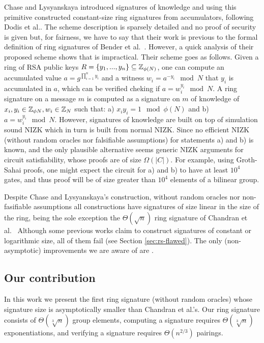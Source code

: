 Chase and Lysyanskaya introduced signatures of knowledge \cite{C:ChaLys06} and using this primitive constructed constant-size ring signatures from accumulators, following Dodis et al.\cite{EC:DKNS04}. The scheme description is sparsely detailed and no proof of security is given but, for fairness, we have to say that their work is previous to the formal definition of ring signatures of Bender et al.~\cite{TCC:BenKatMor06}. However, a quick analysis of their proposed scheme shows that is impractical. Their scheme goes as follows.
Given a ring of RSA public keys $R = \{y_1,...,y_n\}\subseteq \mathbb{Z}_{\phi(N)}$, one can compute an accumulated value $a = g^{\prod_{i=1}^n y_i}$ and a witness $w_i = a^{-y_i} \mod N$ that $y_i$ is accumulated in $a$, which can be verified cheking if $a = w_i^{y_i} \mod N$. A ring signature on a message $m$ is computed as a signature on $m$ of knowledge of $x_i,y_i\in \mathbb{Z}_{\phi{N}}, w_i\in \mathbb{Z}_N$ such that: a) $x_iy_i = 1 \mod \phi(N)$ and b)  $a = w_i^{y_i} \mod N$. However, signatures of knowledge are built on top of simulation sound NIZK which in turn is built from normal NIZK. Since no efficient NIZK (without random oracles nor falsifiable assumptions) for statements a) and b) is known, and the only plausible alternative seems generic NIZK arguments for circuit satisfiability, whose proofs are of size $\Omega(|C|)$. For example, using Groth-Sahai proofs, one might expect the circuit for a) and b) to have at least $10^4$ gates, and thus proof will be of size greater than $10^4$ elements of a bilinear group.

Despite Chase and Lysyanskaya's construction, without random oracles nor non-fasifiable assumptions all constructions have signatures of size linear in the size of the ring, being the sole exception the $\Theta(\sqrt{n})$ ring signature of Chandran et al.~\cite{ICALP:ChaGroSah07} 
Although some previous works claim to construct signatures of constant \cite{ACISP:BosDasRan15} or logarithmic \cite{IET:GriSusPla16} size, all of them fail  (see Section \ref{sec:rs-flawed}). The only (non-asymptotic) improvements we are aware of are \cite{TCC:Rafols15,AC:GonHevRaf15}.

\subsection{Our contribution}
In this work we present the first ring signature (without random oracles) whose signature size is asymptotically smaller than Chandran et al.'s. Our ring signature consists of $\Theta(\sqrt[3]{n})$ group elements, computing a signature requires $\Theta(\sqrt[3]{n})$ exponentiations, and verifying a signature requires $\Theta(n^{2/3})$ pairings.

